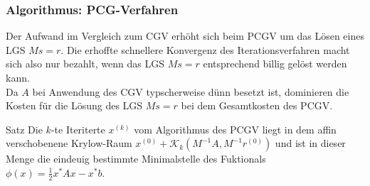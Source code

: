 \documentclass{article}
\begin{document}
    \subsubsection{Algorithmus: PCG-Verfahren}
    Der Aufwand im Vergleich zum CGV erhöht sich beim PCGV um das Lösen eines LGS $Ms=r$. Die erhoffte schnellere
    Konvergenz des Iterationsverfahren macht sich also nur bezahlt, wenn das LGS $Ms=r$ entsprechend billig gelöst
    werden kann. \\
    Da $A$ bei Anwendung des CGV typscherweise dünn besetzt ist, dominieren die Kosten für die Lösung des LGS $Ms=r$ 
    bei dem Gesamtkosten des PCGV.
    \begin{thmbox}{Satz}
        Die $k$-te Iteriterte $x^{(k)}$ vom Algorithmus des PCGV liegt in dem affin verschobenene Krylow-Raum
        $x^{(0)} + \mathcal{K}_k(M^{-1}A, M^{-1}r^{(0)})$ und ist in dieser Menge die eindeuig bestimmte Minimalstelle
        des Fuktionals $\phi(x) = \tfrac{1}{2}x^*Ax-x^*b$.
    \end{thmbox}
\end{document}
